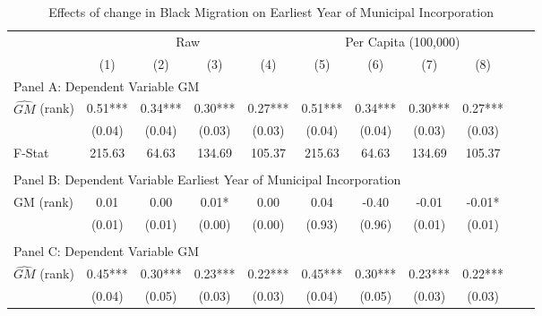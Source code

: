  \begin{table}[htbp]\centering {} \begin{threeparttable} \caption{Effects of change in Black Migration on Earliest Year of Municipal Incorporation} \begin{tabular}{l*{10}{c}} \toprule
                &\multicolumn{4}{c}{Raw}                                    &\multicolumn{4}{c}{Per Capita (100,000)}                   \\\cmidrule(lr){2-5}\cmidrule(lr){6-9}
                &\multicolumn{1}{c}{(1)}   &\multicolumn{1}{c}{(2)}   &\multicolumn{1}{c}{(3)}   &\multicolumn{1}{c}{(4)}   &\multicolumn{1}{c}{(5)}   &\multicolumn{1}{c}{(6)}   &\multicolumn{1}{c}{(7)}   &\multicolumn{1}{c}{(8)}   \\
\cmidrule(lr){1-9}
\multicolumn{8}{l}{Panel A: Dependent Variable GM}\\
\cmidrule(lr){1-9}
$\hat{GM}$ (rank)&       0.51***&       0.34***&       0.30***&       0.27***&       0.51***&       0.34***&       0.30***&       0.27***\\
                &     (0.04)   &     (0.04)   &     (0.03)   &     (0.03)   &     (0.04)   &     (0.04)   &     (0.03)   &     (0.03)   \\
\midrule
F-Stat          &     215.63   &      64.63   &     134.69   &     105.37   &     215.63   &      64.63   &     134.69   &     105.37   \\
\cmidrule[\heavyrulewidth](lr){1-9} \\ \cmidrule[\heavyrulewidth](lr){1-9}
\multicolumn{8}{l}{Panel B: Dependent Variable Earliest Year of Municipal Incorporation}\\
\cmidrule(lr){1-9}
GM  (rank)      &       0.01   &       0.00   &       0.01*  &       0.00   &       0.04   &      -0.40   &      -0.01   &      -0.01*  \\
                &     (0.01)   &     (0.01)   &     (0.00)   &     (0.00)   &     (0.93)   &     (0.96)   &     (0.01)   &     (0.01)   \\
\cmidrule[\heavyrulewidth](lr){1-9} \\ \cmidrule[\heavyrulewidth](lr){1-9}
\multicolumn{8}{l}{Panel C: Dependent Variable GM}\\
\cmidrule(lr){1-9}
$\hat{GM}$ (rank)&       0.45***&       0.30***&       0.23***&       0.22***&       0.45***&       0.30***&       0.23***&       0.22***\\
                &     (0.04)   &     (0.05)   &     (0.03)   &     (0.03)   &     (0.04)   &     (0.05)   &     (0.03)   &     (0.03)   \\

\end{tabular}
\end{threeparttable}
\end{table}
